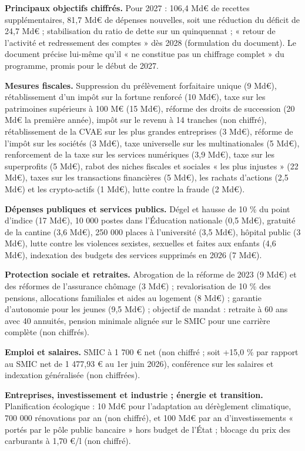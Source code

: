 \documentclass[
  11pt,
  11pt,
  a4paper,
  openany]{book}
\begin{document}
\textbf{Principaux objectifs chiffrés.} Pour 2027 : 106,4 Md€ de
recettes supplémentaires, 81,7 Md€ de dépenses nouvelles, soit une
réduction du déficit de 24,7 Md€ ; stabilisation du ratio de dette sur
un quinquennat ; « retour de l'activité et redressement des comptes »
dès 2028 (formulation du document). Le document précise lui-même qu'il «
ne constitue pas un chiffrage complet » du programme, promis pour le
début de 2027.

\textbf{Mesures fiscales.} Suppression du prélèvement forfaitaire unique
(9 Md€), rétablissement d'un impôt sur la fortune renforcé (10 Md€),
taxe sur les patrimoines supérieurs à 100 M€ (15 Md€), réforme des
droits de succession (20 Md€ la première année), impôt sur le revenu à
14 tranches (non chiffré), rétablissement de la CVAE sur les plus
grandes entreprises (3 Md€), réforme de l'impôt sur les sociétés (3
Md€), taxe universelle sur les multinationales (5 Md€), renforcement de
la taxe sur les services numériques (3,9 Md€), taxe sur les superprofits
(5 Md€), rabot des niches fiscales et sociales « les plus injustes » (22
Md€), taxes sur les transactions financières (5 Md€), les rachats
d'actions (2,5 Md€) et les crypto-actifs (1 Md€), lutte contre la fraude
(2 Md€).

\textbf{Dépenses publiques et services publics.} Dégel et hausse de 10
\% du point d'indice (17 Md€), 10 000 postes dans l'Éducation nationale
(0,5 Md€), gratuité de la cantine (3,6 Md€), 250 000 places à
l'université (3,5 Md€), hôpital public (3 Md€), lutte contre les
violences sexistes, sexuelles et faites aux enfants (4,6 Md€),
indexation des budgets des services supprimés en 2026 (7 Md€).

\textbf{Protection sociale et retraites.} Abrogation de la réforme de
2023 (9 Md€) et des réformes de l'assurance chômage (3 Md€) ;
revalorisation de 10 \% des pensions, allocations familiales et aides au
logement (8 Md€) ; garantie d'autonomie pour les jeunes (9,5 Md€) ;
objectif de mandat : retraite à 60 ans avec 40 annuités, pension
minimale alignée sur le SMIC pour une carrière complète (non chiffrés).

\textbf{Emploi et salaires.} SMIC à 1 700 € net (non chiffré ; soit
+15,0 \% par rapport au SMIC net de 1 477,93 € au 1er juin 2026),
conférence sur les salaires et indexation généralisée (non chiffrées).

\textbf{Entreprises, investissement et industrie ; énergie et
transition.} Planification écologique : 10 Md€ pour l'adaptation au
dérèglement climatique, 700 000 rénovations par an (non chiffré), et 100
Md€ par an d'investissements « portés par le pôle public bancaire » hors
budget de l'État ; blocage du prix des carburants à 1,70 €/l (non
chiffré).
\end{document}
